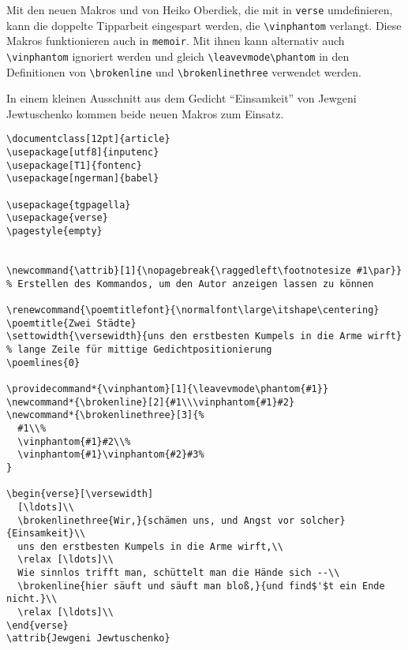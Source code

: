 Mit den neuen Makros  und 
von Heiko Oberdiek, die 
mit  in \texttt{verse} umdefinieren, kann die doppelte
Tipparbeit eingespart werden, die \verb|\vinphantom| verlangt. Diese Makros 
funktionieren auch in \texttt{memoir}.
Mit ihnen kann alternativ auch \verb|\vinphantom| ignoriert werden und gleich 
\verb|\leavevmode\phantom| in den Definitionen von \verb|\brokenline| und 
\verb|\brokenlinethree| verwendet werden.

In einem kleinen Ausschnitt aus dem Gedicht "`Einsamkeit"' von Jewgeni Jewtuschenko
kommen beide neuen Makros zum Einsatz.


\begin{lstlisting}
\documentclass[12pt]{article}
\usepackage[utf8]{inputenc}
\usepackage[T1]{fontenc}
\usepackage[ngerman]{babel}

\usepackage{tgpagella}
\usepackage{verse}
\pagestyle{empty}


\newcommand{\attrib}[1]{\nopagebreak{\raggedleft\footnotesize #1\par}}
% Erstellen des Kommandos, um den Autor anzeigen lassen zu können

\renewcommand{\poemtitlefont}{\normalfont\large\itshape\centering}
\poemtitle{Zwei Städte}
\settowidth{\versewidth}{uns den erstbesten Kumpels in die Arme wirft}
% lange Zeile für mittige Gedichtpositionierung
\poemlines{0}

\providecommand*{\vinphantom}[1]{\leavevmode\phantom{#1}}
\newcommand*{\brokenline}[2]{#1\\\vinphantom{#1}#2}
\newcommand*{\brokenlinethree}[3]{%
  #1\\%
  \vinphantom{#1}#2\\%
  \vinphantom{#1}\vinphantom{#2}#3%
}

\begin{verse}[\versewidth]
  [\ldots]\\ 
  \brokenlinethree{Wir,}{schämen uns, und Angst vor solcher}{Einsamkeit}\\
  uns den erstbesten Kumpels in die Arme wirft,\\
  \relax [\ldots]\\
  Wie sinnlos trifft man, schüttelt man die Hände sich --\\
  \brokenline{hier säuft und säuft man bloß,}{und find$'$t ein Ende nicht.}\\
  \relax [\ldots]\\
\end{verse}
\attrib{Jewgeni Jewtuschenko}


\end{lstlisting}

